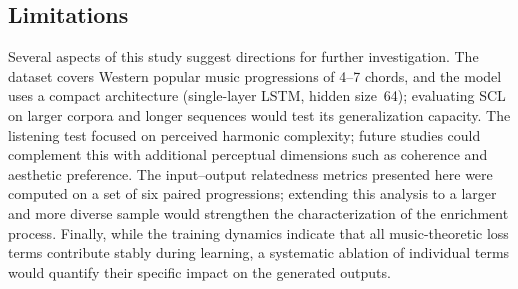 \documentclass[conference]{IEEEtran}
\begin{document}
\subsection{Limitations}
Several aspects of this study suggest directions for further investigation. The dataset covers Western popular music progressions of 4--7 chords, and the model uses a compact architecture (single-layer LSTM, hidden size~64); evaluating SCL on larger corpora and longer sequences would test its generalization capacity. The listening test focused on perceived harmonic complexity; future studies could complement this with additional perceptual dimensions such as coherence and aesthetic preference. The input--output relatedness metrics presented here were computed on a set of six paired progressions; extending this analysis to a larger and more diverse sample would strengthen the characterization of the enrichment process. Finally, while the training dynamics indicate that all music-theoretic loss terms contribute stably during learning, a systematic ablation of individual terms would quantify their specific impact on the generated outputs.
\end{document}
